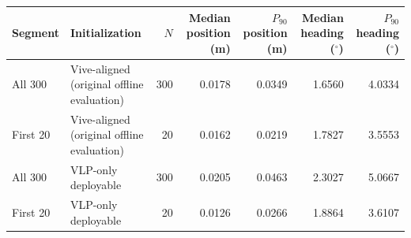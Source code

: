 \begin{tabular}{llrrrrr}
\toprule
Segment & Initialization & $N$ & Median position (m) & $P_{90}$ position (m) & Median heading ($^\circ$) & $P_{90}$ heading ($^\circ$) \\
\midrule
All 300 & Vive-aligned (original offline evaluation) & 300 & 0.0178 & 0.0349 & 1.6560 & 4.0334 \\
First 20 & Vive-aligned (original offline evaluation) & 20 & 0.0162 & 0.0219 & 1.7827 & 3.5553 \\
All 300 & VLP-only deployable & 300 & 0.0205 & 0.0463 & 2.3027 & 5.0667 \\
First 20 & VLP-only deployable & 20 & 0.0126 & 0.0266 & 1.8864 & 3.6107 \\
\bottomrule
\end{tabular}
